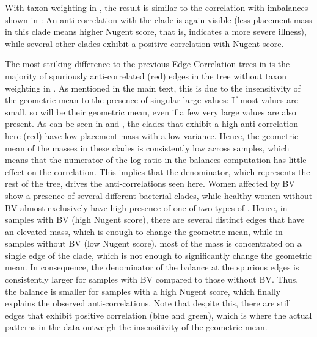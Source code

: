 With taxon weighting in ,
the result is similar to the correlation with imbalances shown in :
An anti-correlation with the  clade is again visible
(less placement mass in this clade means higher Nugent score, that is, indicates a more severe illness),
while several other clades exhibit a positive correlation with Nugent score.

The most striking difference to the previous Edge Correlation trees in 
is the majority of spuriously anti-correlated (red) edges in the tree without taxon weighting
in .
As mentioned in the main text, this is due to the insensitivity of the geometric mean
to the presence of singular large values:
If most values are small, so will be their geometric mean, even if a few very large values are also present.
As can be seen in  and ,
the clades that exhibit a high anti-correlation here (red) have low placement mass with a low variance.
Hence, the geometric mean of the masses in these clades is consistently low across samples,
which means that the numerator of the log-ratio in the balances computation has little effect on the correlation.
This implies that the denominator, which represents the rest of the tree, drives the anti-correlations seen here.
Women affected by \ac{BV} show a presence of several different bacterial clades,
while healthy women without \ac{BV} almost exclusively have high presence
of one of two types of  \cite{Srinivasan2012}.
Hence, in samples with \ac{BV} (high Nugent score), there are several distinct edges that have an elevated mass,
which is enough to change the geometric mean,
while in samples without \ac{BV} (low Nugent score),
most of the mass is concentrated on a single edge of the  clade,
which is not enough to significantly change the geometric mean.
In consequence, the denominator of the balance at the spurious edges is consistently larger
for samples with \ac{BV} compared to those without \ac{BV}.
Thus, the balance is smaller for samples with a high Nugent score,
which finally explains the observed anti-correlations.
Note that despite this, there are still edges that exhibit positive correlation (blue and green),
which is where the actual patterns in the data outweigh the insensitivity of the geometric mean.

